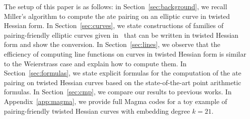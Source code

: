 The setup of this paper is as follows:
in Section~\ref{sec:background}, we recall Miller's algorithm to compute the ate pairing on an elliptic curve in twisted Hessian form.
In Section~\ref{sec:curves}, we state constructions of families of pairing-friendly elliptic curves given in~\cite{2010/freeman}
that can be written in twisted Hessian form and show the conversion.
In Section~\ref{sec:lines}, we observe that the efficiency of computing line functions on curves in twisted Hessian form is similar to the Weierstrass case
and explain how to compute them.
In Section~\ref{sec:formulas}, we state explicit formulas for the computation of the ate pairing on twisted Hessian curves based on the state-of-the-art point arithmetic formulas.
In Section~\ref{sec:cmp}, we compare our results to previous works.
In Appendix~\ref{app:magma}, we provide full Magma codes for a toy example of pairing-friendly twisted Hessian curves with embedding degree $k = 21$.


